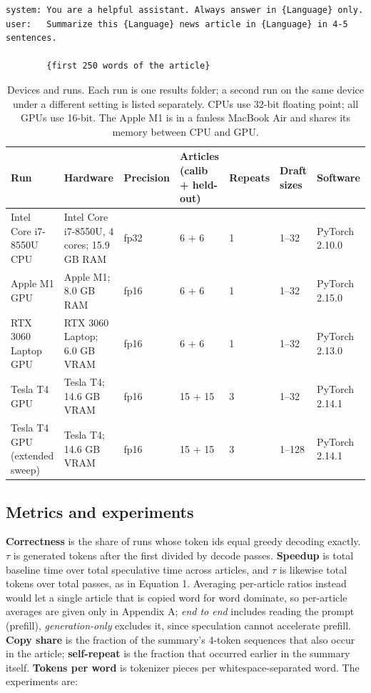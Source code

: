 \documentclass[11pt,a4paper]{article}
\begin{document}
\begin{lstlisting}
system: You are a helpful assistant. Always answer in {Language} only.
user:   Summarize this {Language} news article in {Language} in 4-5 sentences.

        {first 250 words of the article}
\end{lstlisting}
\begin{table}[tbp]
\centering
\small
\caption{Devices and runs. Each run is one results folder; a second run on the same device under a different setting is listed separately. CPUs use 32-bit floating point; all GPUs use 16-bit. The Apple M1 is in a fanless MacBook Air and shares its memory between CPU and GPU.}
\setlength{\tabcolsep}{4pt}
\begin{tabular}{L{2.61cm}L{3.08cm}L{1.58cm}L{1.96cm}L{1.49cm}L{1.40cm}L{2.05cm}}
\toprule
\textbf{Run} & \textbf{Hardware} & \textbf{Precision} & \textbf{Articles (calib + held-out)} & \textbf{Repeats} & \textbf{Draft sizes} & \textbf{Software} \\
\midrule
Intel Core i7-8550U CPU & Intel Core i7-8550U, 4 cores; 15.9 GB RAM & fp32 & 6 + 6 & 1 & 1--32 & PyTorch 2.10.0 \\
Apple M1 GPU & Apple M1; 8.0 GB RAM & fp16 & 6 + 6 & 1 & 1--32 & PyTorch 2.15.0 \\
RTX 3060 Laptop GPU & RTX 3060 Laptop; 6.0 GB VRAM & fp16 & 6 + 6 & 1 & 1--32 & PyTorch 2.13.0 \\
Tesla T4 GPU & Tesla T4; 14.6 GB VRAM & fp16 & 15 + 15 & 3 & 1--32 & PyTorch 2.14.1 \\
Tesla T4 GPU (extended sweep) & Tesla T4; 14.6 GB VRAM & fp16 & 15 + 15 & 3 & 1--128 & PyTorch 2.14.1 \\
\bottomrule
\end{tabular}
\end{table}
\subsection{Metrics and experiments}
\textbf{Correctness} is the share of runs whose token ids equal greedy decoding exactly. \textbf{$\tau$} is generated tokens after the first divided by decode passes. \textbf{Speedup} is total baseline time over total speculative time across articles, and $\tau$ is likewise total tokens over total passes, as in Equation 1. Averaging per-article ratios instead would let a single article that is copied word for word dominate, so per-article averages are given only in Appendix A; \emph{end to end} includes reading the prompt (prefill), \emph{generation-only} excludes it, since speculation cannot accelerate prefill. \textbf{Copy share} is the fraction of the summary's 4-token sequences that also occur in the article; \textbf{self-repeat} is the fraction that occurred earlier in the summary itself. \textbf{Tokens per word} is tokenizer pieces per whitespace-separated word. The experiments are:
\end{document}
